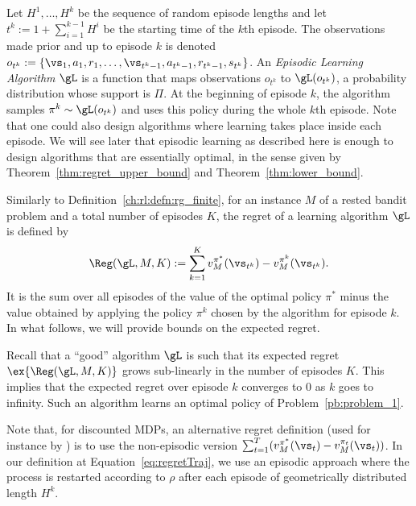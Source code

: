 Let $H^1,\ldots, H^k$ be the sequence of random episode lengths and let
$t^k:=1{+}\sum_{i=1}^{k-1}H^i$ be the starting time of the $k$th episode.
The observations made prior and up to episode \(k\) is denoted \(o_{t^{k}}:=\{\vs_1,a_1,r_1,\dots,\vs_{t^k-1},a_{t^k-1},r_{t^k-1},s_{t^k}\}\).
An \emph{Episodic Learning
Algorithm} \(\gL\) is a function that maps observations \(o_{t^k}\) to
\(\gL(o_{t^k})\), a probability distribution whose support is $\Pi$. At the
beginning of episode $k$, the algorithm samples \(\pi^k\sim\gL(o_{t^k})\)
and uses this policy during the whole $k$th episode. Note that one could also
design algorithms where learning takes place inside each episode. We will see
later that episodic learning as described here is enough to design algorithms
that are essentially optimal, in the sense given by Theorem~\ref{thm:regret_upper_bound} and Theorem~\ref{thm:lower_bound}.

Similarly to Definition~\ref{ch:rl:defn:rg_finite}, for an instance \(M\) of a rested bandit problem and a total number of episodes $K$, the regret of a learning algorithm \(\gL\) is defined by
\begin{align}
  \Reg(\gL,M,K) :=  \sum_{k=1}^K %
      v^{\pi^*}_M(\vs_{t^k}) - v^{\pi^k}_M(\vs_{t^k})%
      .\label{eq:regretTraj}
\end{align}
It is the sum over all episodes of the value of the optimal policy $\pi^*$ minus the value obtained by applying the policy $\pi^k$ chosen by the algorithm for episode $k$. In what follows, we will provide bounds on the expected regret.

Recall that a ``good'' algorithm $\gL$ is such that its expected regret $\ex{\Reg(\gL,M,K)}$ grows sub-linearly in the number of episodes $K$. This implies that the expected regret over episode $k$  converges to $0$ as $k$ goes to infinity. Such an algorithm learns an optimal policy of Problem~\ref{pb:problem_1}.

Note that, for discounted MDPs, an alternative regret definition (used for instance by \cite{zhou2021nearly}) is to use the non-episodic version $\sum_{t=1}^T (v^{\pi^*}_M(\vs_{t}) - v^{\pi_t}_M(\vs_{t}))$. In our definition at Equation~\eqref{eq:regretTraj}, we use an episodic approach where the process is restarted according to $\rho$ after each episode of geometrically distributed length $H^k$.

